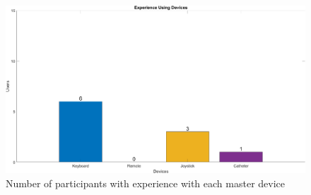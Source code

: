 \begin{figure}[ht]
   \centering
   \includegraphics[width=1.0\textwidth]{img/poll/expdev.png}
   \caption{Number of participants with experience with each master device}
   \label{img:expdev}
\end{figure}


